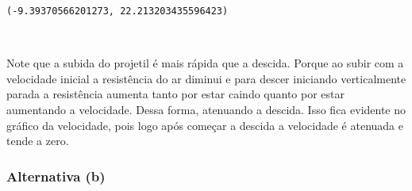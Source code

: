 \documentclass[12pt, a4paper]{article}
\makeatletter
\newcommand{\boxspacing}{\kern\kvtcb@left@rule\kern\kvtcb@boxsep}
\newcommand{\prompt}[4]{
        {\ttfamily\llap{{\color{#2}[#3]:\hspace{3pt}#4}}\vspace{-\baselineskip}}
    }
\makeatother
\begin{document}
            \begin{tcolorbox}[breakable, size=fbox, boxrule=.5pt, pad at break*=1mm, opacityfill=0]
\prompt{Out}{outcolor}{24}{\boxspacing}
\begin{Verbatim}[commandchars=\\\{\}]
(-9.39370566201273, 22.213203435596423)
\end{Verbatim}
\end{tcolorbox}
        
    \begin{center}
    \end{center}
    { \hspace*{\fill} \\}
    
    Note que a subida do projetil é mais rápida que a descida. Porque ao
subir com a velocidade inicial a resistência do ar diminui e para descer
iniciando verticalmente parada a resistência aumenta tanto por estar
caindo quanto por estar aumentando a velocidade. Dessa forma, atenuando
a descida. Isso fica evidente no gráfico da velocidade, pois logo após
começar a descida a velocidade é atenuada e tende a zero.

    \hypertarget{alternativa-b}{%
\subsubsection{Alternativa (b)}\label{alternativa-b}}
\end{document}
